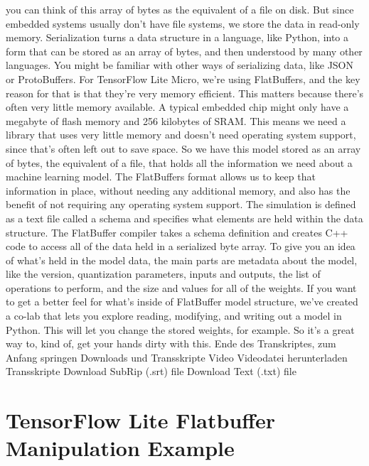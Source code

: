     you can think of this array of bytes as the equivalent of a file on disk.
    But since embedded systems usually don't have file systems,
    we store the data in read-only memory.
    Serialization turns a data structure in a language,
    like Python, into a form that can be stored as an array of bytes,
    and then understood by many other languages.
    You might be familiar with other ways of serializing data,
    like JSON or ProtoBuffers.
    For TensorFlow Lite Micro, we're using FlatBuffers,
    and the key reason for that is that they're very memory efficient.
    This matters because there's often very little memory available.
    A typical embedded chip might only have a megabyte of flash memory
    and 256 kilobytes of SRAM.
    This means we need a library that uses very little memory
    and doesn't need operating system support,
    since that's often left out to save space.
    So we have this model stored as an array of bytes,
    the equivalent of a file, that holds all the information we
    need about a machine learning model.
    The FlatBuffers format allows us to keep that information in place,
    without needing any additional memory, and also has
    the benefit of not requiring any operating system support.
    The simulation is defined as a text file called a schema
    and specifies what elements are held within the data structure.
    The FlatBuffer compiler takes a schema definition and creates C++ code
    to access all of the data held in a serialized byte array.
    To give you an idea of what's held in the model data,
    the main parts are metadata about the model, like the version, quantization
    parameters, inputs and outputs, the list of operations to perform,
    and the size and values for all of the weights.
    If you want to get a better feel for what's inside of FlatBuffer model
    structure, we've created a co-lab that lets you explore reading, modifying,
    and writing out a model in Python.
    This will let you change the stored weights, for example.
    So it's a great way to, kind of, get your hands dirty with this.
    Ende des Transkriptes, zum Anfang springen
    Downloads und Transskripte
    Video
    Videodatei herunterladen
    Transskripte
    Download SubRip (.srt) file
    Download Text (.txt) file  
    
    \section{TensorFlow Lite Flatbuffer Manipulation Example}    
    
